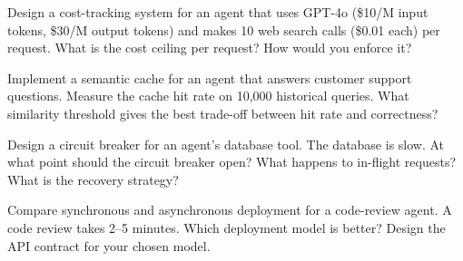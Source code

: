 \begin{exercise}
	Design a cost-tracking system for an agent that uses GPT-4o (\$10/M input tokens, \$30/M output tokens) and makes 10 web search calls (\$0.01 each) per request. What is the cost ceiling per request? How would you enforce it?
\end{exercise}

\begin{exercise}
	Implement a semantic cache for an agent that answers customer support questions. Measure the cache hit rate on 10,000 historical queries. What similarity threshold gives the best trade-off between hit rate and correctness?
\end{exercise}

\begin{exercise}
	Design a circuit breaker for an agent's database tool. The database is slow. At what point should the circuit breaker open? What happens to in-flight requests? What is the recovery strategy?
\end{exercise}

\begin{exercise}
	Compare synchronous and asynchronous deployment for a code-review agent. A code review takes 2--5 minutes. Which deployment model is better? Design the API contract for your chosen model.
\end{exercise}
